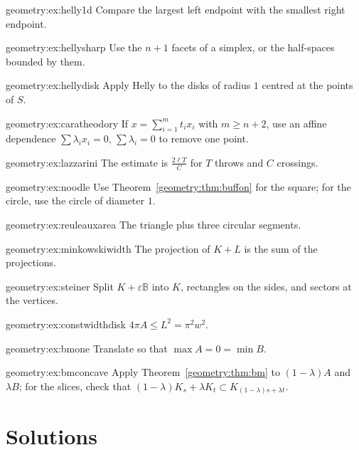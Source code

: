 \begin{hint}{geometry:ex:helly1d}
Compare the largest left endpoint with the smallest right endpoint.
\end{hint}
\begin{hint}{geometry:ex:hellysharp}
Use the $n+1$ facets of a simplex, or the half-spaces bounded by them.
\end{hint}
\begin{hint}{geometry:ex:hellydisk}
Apply Helly to the disks of radius $1$ centred at the points of $S$.
\end{hint}
\begin{hint}{geometry:ex:caratheodory}
If $x=\sum_{i=1}^mt_ix_i$ with $m\ge n+2$, use an affine dependence $\sum\lambda_ix_i=0$, $\sum\lambda_i=0$ to remove one point.
\end{hint}
\begin{hint}{geometry:ex:lazzarini}
The estimate is $\frac{2\ell T}C$ for $T$ throws and $C$ crossings.
\end{hint}
\begin{hint}{geometry:ex:noodle}
Use Theorem~\ref{geometry:thm:buffon} for the square; for the circle, use the circle of diameter $1$.
\end{hint}
\begin{hint}{geometry:ex:reuleauxarea}
The triangle plus three circular segments.
\end{hint}
\begin{hint}{geometry:ex:minkowskiwidth}
The projection of $K+L$ is the sum of the projections.
\end{hint}
\begin{hint}{geometry:ex:steiner}
Split $K+\varepsilon\mathbb B$ into $K$, rectangles on the sides, and sectors at the vertices.
\end{hint}
\begin{hint}{geometry:ex:constwidthdisk}
$4\pi A\le L^2=\pi^2w^2$.
\end{hint}
\begin{hint}{geometry:ex:bmone}
Translate so that $\max A=0=\min B$.
\end{hint}
\begin{hint}{geometry:ex:bmconcave}
Apply Theorem~\ref{geometry:thm:bm} to $(1-\lambda)A$ and $\lambda B$; for the slices, check that $(1-\lambda)K_s+\lambda K_t\subset K_{(1-\lambda)s+\lambda t}$.
\end{hint}

\section{Solutions}

